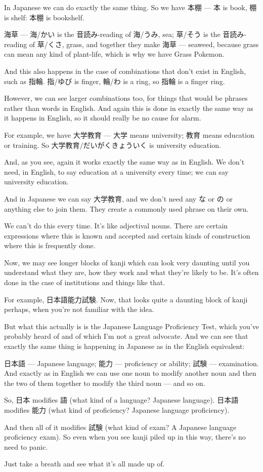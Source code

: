 In Japanese we can do exactly the same thing. So we have 本棚 --- 本 is book, 棚 is shelf: 本棚 is bookshelf.

海草 --- 海/かい is the 音読み-reading of 海/うみ, sea; 草/そう is the 音読み-reading of 草/くさ, grass, and together they make 海草 --- seaweed, because grass can mean any kind of plant-life, which is why we have Grass Pokemon.

And this also happens in the case of combinations that don't exist in English, such as 指輪. 指/ゆび is finger, 輪/わ is a ring, so 指輪 is a finger ring.

However, we can see larger combinations too, for things that would be phrases rather than words in English. And again this is done in exactly the same way as it happens in English, so it should really be no cause for alarm.

For example, we have 大学教育 --- 大学 means university; 教育 means education or training. So 大学教育/だいがくきょういく is university education.

And, as you see, again it works exactly the same way as in English. We don't need, in English, to say education at a university every time; we can say university education.

And in Japanese we can say 大学教育, and we don't need any な or の or anything else to join them. They create a commonly used phrase on their own.

We can't do this every time. It's like adjectival nouns. There are certain expressions where this is known and accepted and certain kinds of construction where this is frequently done.

Now, we may see longer blocks of kanji which can look very daunting until you understand what they are, how they work and what they're likely to be. It's often done in the case of institutions and things like that.

For example, 日本語能力試験. Now, that looks quite a daunting block of kanji perhaps, when you're not familiar with the idea.

But what this actually is is the Japanese Language Proficiency Test, which you've probably heard of and of which I'm not a great advocate. And we can see that exactly the same thing is happening in Japanese as in the English equivalent:

日本語 --- Japanese language; 能力 --- proficiency or ability; 試験 --- examination. And exactly as in English we can use one noun to modify another noun and then the two of them together to modify the third noun --- and so on.

So, 日本 modifies 語 (what kind of a language? Japanese language). 日本語 modifies 能力 (what kind of proficiency? Japanese language proficiency).

And then all of it modifies 試験 (what kind of exam? A Japanese language proficiency exam). So even when you see kanji piled up in this way, there's no need to panic.

Just take a breath and see what it's all made up of.

\stopsectionlevel

\stopsectionlevel

\stopsectionlevel
